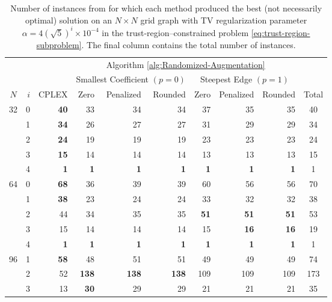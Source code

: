 \documentclass[pdflatex,sn-mathphys-num]{sn-jnl}%
\begin{document}
\begin{table}[]
    \centering
\begin{tabular}{cr|r|rrr|rrr|c}
 &  &       & \multicolumn{6}{c|}{Algorithm \ref{alg:Randomized-Augmentation}} \\
 &  &       & \multicolumn{3}{c}{Smallest Coefficient $(p=0)$} & \multicolumn{3}{|c|}{Steepest Edge $(p=1)$} \\ $N$ & $i$ & CPLEX & Zero & Penalized & Rounded & Zero & Penalized & Rounded & Total\\
\hline
\multirow[t]{5}{*}{32} & 0 & \textbf{40} & 33 & 34 & 34 & 37 & 35 & 35 & 40\\
 & 1 & \textbf{34} & 26 & 27 & 27 & 31 & 29 & 29 & 34 \\
 & 2 & \textbf{24} & 19 & 19 & 19 & 23 & 23 & 23 & 24\\
 & 3 & \textbf{15} & 14 & 14 & 14 & 13 & 13 & 13 & 15 \\
 & 4 & \textbf{1} & \textbf{1} & \textbf{1} & \textbf{1} & \textbf{1} & \textbf{1} & \textbf{1} & 1\\
\hline
\multirow[t]{5}{*}{64} & 0 & \textbf{68} & 36 & 39 & 39 & 60 & 56 & 56 & 70\\
 & 1 & \textbf{38} & 23 & 24 & 24 & 33 & 32 & 32 & 38\\
 & 2 & 44 & 34 & 35 & 35 & \textbf{51} & \textbf{51} & \textbf{51} & 53\\
 & 3 & 15 & 14 & 14 & 14 & 15 & \textbf{16} & \textbf{16} & 19 \\
 & 4 & \textbf{1} & \textbf{1} & \textbf{1} & \textbf{1} & \textbf{1} & \textbf{1} & \textbf{1} & 1\\
\hline
\multirow[t]{3}{*}{96} & 1 & \textbf{58} & 48 & 51 & 51 & 49 & 49 & 49 & 74\\
 & 2 & 52 & \textbf{138} & \textbf{138} & \textbf{138} & 109 & 109 & 109 & 173\\
 & 3 & 13 & \textbf{30} & 29 & 29 & 21 & 21 & 21 & 35\\

\end{tabular}
    \caption{Number of instances from \cite{manns2024discrete} for which each method produced the best (not necessarily optimal) solution on an $N\times N$ grid graph with TV regularization parameter $\alpha = 4(\sqrt{5})^i \times 10^{-4}$ in the trust-region--constrained problem \eqref{eq:trust-region-subproblem}. The final column contains the total number of instances.}
    \label{tab:trust-region-wins}
\end{table}
\end{document}
